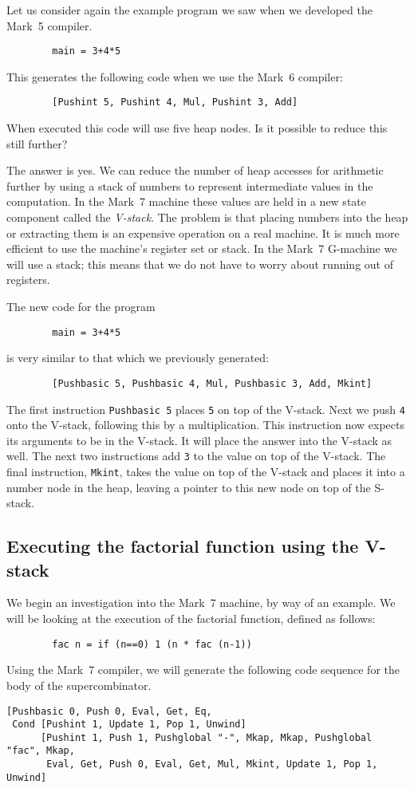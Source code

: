 Let us consider again the example program we saw when we developed the
Mark~5 compiler.
\begin{verbatim}
        main = 3+4*5
\end{verbatim}
This generates the following code when we use the Mark~6 compiler:
\begin{verbatim}
        [Pushint 5, Pushint 4, Mul, Pushint 3, Add]
\end{verbatim}
When executed this code will use five heap nodes. Is it possible to
reduce this still further?

The answer is yes. We can reduce the number of heap accesses for
arithmetic further by using a stack of numbers to represent
intermediate values in the computation. In the Mark~7 machine these
values are held in a new state component called the {\em
V-stack}. The problem is that placing numbers into the
heap or extracting them is an expensive operation on a real machine.
It is much more efficient to use the machine's register set or
stack. In the Mark~7 G-machine we will use a stack; this means that we
do not have to worry about running out of registers.

The new code for the program
\begin{verbatim}
        main = 3+4*5
\end{verbatim}
is very similar to that which we previously generated:
\begin{verbatim}
        [Pushbasic 5, Pushbasic 4, Mul, Pushbasic 3, Add, Mkint]
\end{verbatim}
The first instruction \mbox{\tt Pushbasic\ 5} places \mbox{\tt 5} on top of the V-stack.
Next we push \mbox{\tt 4} onto the V-stack, following this by a multiplication.
This instruction now expects its arguments to be in the V-stack. It
will place the answer into the V-stack as well. The next two
instructions add \mbox{\tt 3} to the value on top of the V-stack. The final
instruction, \mbox{\tt Mkint}, takes the value on top of the V-stack and places
it into a number node in the heap, leaving a pointer to this new node
on top of the S-stack.

\subsection{Executing the factorial function using the V-stack}

We begin an investigation into the Mark~7 machine, by way of an
example.  We will be looking at the execution of the factorial
function, defined as follows:
\begin{verbatim}
        fac n = if (n==0) 1 (n * fac (n-1))
\end{verbatim}
Using the Mark~7 compiler, we will generate the following code
sequence for the body of the supercombinator.
\begin{verbatim}
[Pushbasic 0, Push 0, Eval, Get, Eq,
 Cond [Pushint 1, Update 1, Pop 1, Unwind]
      [Pushint 1, Push 1, Pushglobal "-", Mkap, Mkap, Pushglobal "fac", Mkap,
       Eval, Get, Push 0, Eval, Get, Mul, Mkint, Update 1, Pop 1, Unwind]
\end{verbatim}

